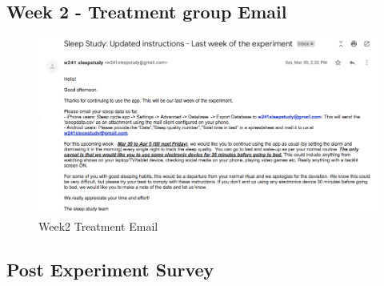 \documentclass[12pt,]{article}
\begin{document}
\subsection{Week 2 - Treatment group
Email}\label{week-2---treatment-group-email}

\begin{figure}[H]

{\centering \includegraphics[width=1\linewidth]{img/week2_treatment} 

}

\caption{Week2 Treatment Email}\label{fig:unnamed-chunk-12}
\end{figure}

\subsection{Post Experiment Survey}\label{post-experiment-survey}
\end{document}
